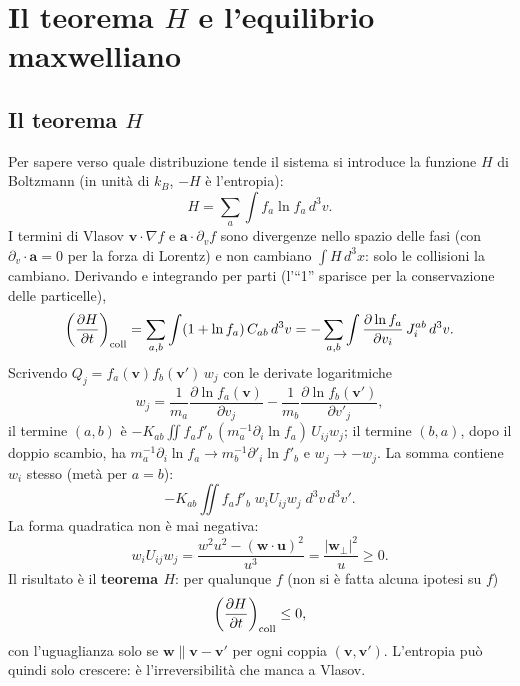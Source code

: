 \section{Il teorema $H$ e l'equilibrio maxwelliano}

\subsection{Il teorema $H$}
Per sapere verso quale distribuzione tende il sistema si introduce la funzione $H$ di Boltzmann (in unità di $k_B$, $-H$ è l'entropia):
\begin{equation}
H=\sum_a\int f_a\ln f_a\,d^3v .
\end{equation}
I termini di Vlasov $\mathbf{v}\cdot\nabla f$ e $\mathbf{a}\cdot\partial_vf$ sono divergenze nello spazio delle fasi (con $\partial_v\cdot\mathbf{a}=0$ per la forza di Lorentz) e non cambiano $\int H\,d^3x$: solo le collisioni la cambiano. Derivando e integrando per parti (l'``1'' sparisce per la conservazione delle particelle),
\begin{equation}
\left(\frac{\partial H}{\partial t}\right)_{\rm coll}=\sum_{a,b}\int(1+\ln f_a)\,C_{ab}\,d^3v=-\sum_{a,b}\int\frac{\partial\ln f_a}{\partial v_i}\,J_i^{ab}\,d^3v .
\end{equation}
Scrivendo $Q_j=f_a(\mathbf{v})f_b(\mathbf{v}')\,w_j$ con le derivate logaritmiche
\begin{equation}
w_j=\frac{1}{m_a}\frac{\partial\ln f_a(\mathbf{v})}{\partial v_j}-\frac{1}{m_b}\frac{\partial\ln f_b(\mathbf{v}')}{\partial v'_j},
\end{equation}
il termine $(a,b)$ è $-K_{ab}\iint f_af'_b\,(m_a^{-1}\partial_i\ln f_a)\,U_{ij}w_j$; il termine $(b,a)$, dopo il doppio scambio, ha $m_a^{-1}\partial_i\ln f_a\to m_b^{-1}\partial'_i\ln f'_b$ e $w_j\to-w_j$. La somma contiene $w_i$ stesso (metà per $a=b$):
\begin{equation}
-K_{ab}\iint f_af'_b\;w_iU_{ij}w_j\;d^3v\,d^3v'.
\end{equation}
La forma quadratica non è mai negativa:
\begin{equation}
w_iU_{ij}w_j=\frac{w^2u^2-(\mathbf{w}\cdot\mathbf{u})^2}{u^3}=\frac{|\mathbf{w}_\perp|^2}{u}\ge0 .
\end{equation}
Il risultato è il \textbf{teorema $H$}: per qualunque $f$ (non si è fatta alcuna ipotesi su $f$)
\begin{equation}
\left(\frac{\partial H}{\partial t}\right)_{\rm coll}\le0,
\end{equation}
con l'uguaglianza solo se $\mathbf{w}\parallel\mathbf{v}-\mathbf{v}'$ per ogni coppia $(\mathbf{v},\mathbf{v}')$. L'entropia può quindi solo crescere: è l'irreversibilità che manca a Vlasov.

